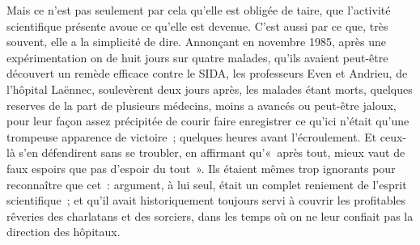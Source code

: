 \documentclass[french,twoside]{book} %
\begin{document}
Mais ce n’est pas seulement par cela qu’elle est obligée de taire, que l’activité scientifique présente avoue ce qu’elle est devenue. C’est aussi par ce que, très souvent, elle a la simplicité de dire. Annonçant en novembre 1985, après une expérimentation on de huit jours sur quatre malades, qu’ils avaient peut-être découvert un remède efficace contre le SIDA, les professeurs Even et Andrieu, de l’hôpital Laënnec, soulevèrent deux jours après, les malades étant morts, quelques reserves de la part de plusieurs médecins, moins a avancés ou peut-être jaloux, pour leur façon assez précipitée de courir faire enregistrer ce qu’ici n’était qu’une trompeuse apparence de victoire ; quelques heures avant l’écroulement. Et ceux-là s’en défendirent sans se troubler, en affirmant qu’« après tout, mieux vaut de faux espoirs que pas d’espoir du tout ». Ils étaient mêmes trop ignorants pour reconnaître que cet : argument, à lui seul, était un complet reniement de l’esprit scientifique ; et qu’il avait historiquement toujours servi à couvrir les profitables rêveries des charlatans et des sorciers, dans les temps où on ne leur confiait pas la direction des hôpitaux.\par
\end{document}
